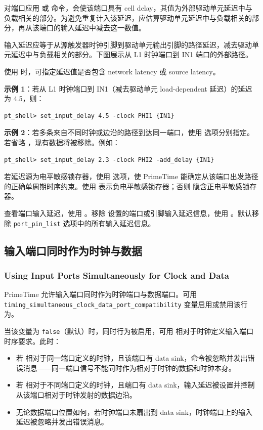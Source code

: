 对端口应用  或  命令，会使该端口具有 cell delay，其值为外部驱动单元延迟中与负载相关的部分。为避免重复计入该延迟，应估算驱动单元延迟中与负载相关的部分，再从该端口的输入延迟中减去这一数值。

输入延迟应等于从源触发器时钟引脚到驱动单元输出引脚的路径延迟，减去驱动单元延迟中与负载相关的部分。下图展示从 L1 时钟端口到 IN1 端口的外部路径。


使用  时，可指定延迟值是否包含 network latency 或 source latency。

\textbf{示例 1}：若从 L1 时钟端口到 IN1（减去驱动单元 load-dependent 延迟）的延迟为 4.5，则：
\begin{lstlisting}
pt_shell> set_input_delay 4.5 -clock PHI1 {IN1}
\end{lstlisting}

\textbf{示例 2}：若多条来自不同时钟或边沿的路径到达同一端口，使用  选项分别指定。若省略 ，现有数据将被移除。例如：
\begin{lstlisting}
pt_shell> set_input_delay 2.3 -clock PHI2 -add_delay {IN1}
\end{lstlisting}

若延迟源为电平敏感锁存器，使用  选项，使 PrimeTime 能确定从该端口出发路径的正确单周期时序约束。使用  表示负电平敏感锁存器；否则  隐含正电平敏感锁存器。

查看端口输入延迟，使用 。移除  设置的端口或引脚输入延迟信息，使用 。默认移除 \texttt{port\_pin\_list} 选项中的所有输入延迟信息。

\subsection{输入端口同时作为时钟与数据}
\subsubsection*{Using Input Ports Simultaneously for Clock and Data}

PrimeTime 允许输入端口同时作为时钟端口与数据端口。可用 \texttt{timing\_simultaneous\_clock\_data\_port\_compatibility} 变量启用或禁用该行为。

当该变量为 \texttt{false}（默认）时，同时行为被启用，可用  相对于时钟定义输入端口时序要求。此时：
\begin{itemize}
  \item 若  相对于同一端口定义的时钟，且该端口有 data sink，命令被忽略并发出错误消息——同一端口信号不能同时作为相对于时钟的数据和时钟本身。
  \item 若  相对于不同端口定义的时钟，且端口有 data sink，输入延迟被设置并控制从该端口相对于时钟发射的数据边沿。
  \item 无论数据端口位置如何，若时钟端口未扇出到 data sink，时钟端口上的输入延迟被忽略并发出错误消息。
\end{itemize}

